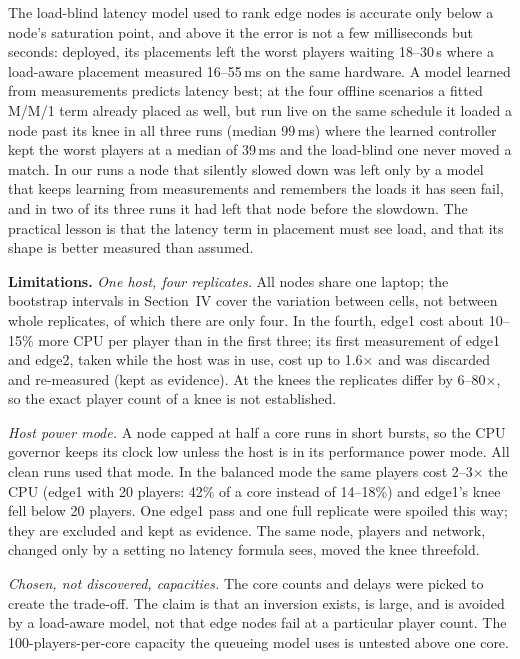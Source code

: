 \documentclass[conference]{IEEEtran}
\begin{document}
The load-blind latency model used to rank edge nodes is accurate only below a
node's saturation point, and above it the error is not a few milliseconds but
seconds: deployed, its placements left the worst players waiting 18--30\,s
where a load-aware placement measured 16--55\,ms on the same hardware. A model
learned from measurements predicts latency best; at the four offline
scenarios a fitted M/M/1 term already placed as well, but run live on the
same schedule it loaded a node past its knee in all three runs (median
99\,ms) where the learned controller kept the worst players at a median of
39\,ms and the load-blind one never moved a match. In our runs a node that
silently slowed down was left only by a model that keeps learning from
measurements and remembers the loads it has seen fail, and in two of its
three runs it had left that node before the slowdown. The practical
lesson is
that the latency term in placement must see load, and that its shape is
better measured than assumed.

\textbf{Limitations.} \emph{One host, four replicates.} All nodes share one laptop; the bootstrap
intervals in Section~IV cover the variation between cells, not between
whole replicates, of which there are only four. In the fourth, edge1 cost
about 10--15\% more CPU per player than in the first three; its first
measurement of edge1 and edge2, taken while the host was in use, cost up to
1.6$\times$ and was discarded and re-measured (kept as evidence). At the knees the replicates differ
by 6--80$\times$, so the exact player count of a knee is not established.

\emph{Host power mode.} A node capped at half a core runs in short
bursts, so the CPU governor keeps its clock low unless the host is in its
performance power mode. All clean runs used that mode. In the balanced mode
the same players cost 2--3$\times$ the CPU (edge1 with 20 players: 42\% of a
core instead of 14--18\%) and edge1's knee fell below 20 players. One edge1
pass and one full replicate were spoiled this way; they are excluded and kept
as evidence. The same node, players and network, changed only by a setting no
latency formula sees, moved the knee threefold.

\emph{Chosen, not discovered, capacities.} The core counts and delays were
picked to create the trade-off. The claim is that an inversion exists, is
large, and is avoided by a load-aware model, not that edge nodes fail at a
particular player count. The 100-players-per-core capacity the queueing model
uses is untested above one core.
\end{document}
